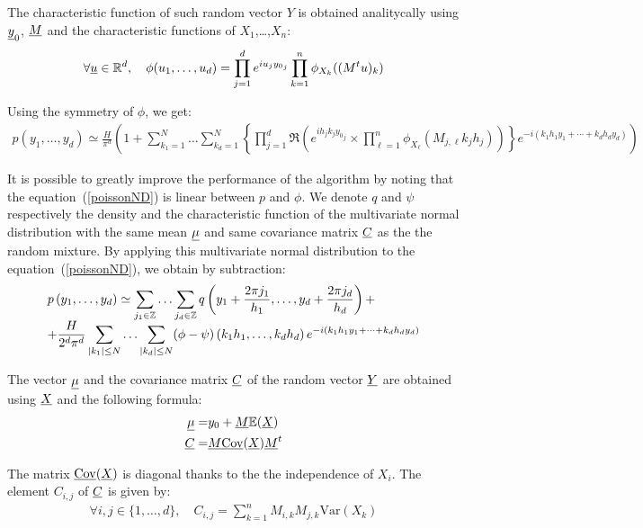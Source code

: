 The characteristic function of such random vector $Y$ is obtained analitycally using ${\underline{y}}_0$, ${\underline{M}}$ and the characteristic functions of $X_1$,\dots,$X_n$:
\begin{align}
  \forall {\underline{u}}\in\mathbb{R}^d,\quad\phi(u_1,\hdots,u_d)=\prod_{j=1}^de^{iu_j{y_0}_j}\prod_{k=1}^n\phi_{X_k}((M^tu)_k)
\end{align}

Using the symmetry of $\phi$, we get:
\begin{align}
  p\left(y_1,\hdots,y_d\right)\simeq\frac{H}{\pi^d} \left(1+
  \sum_{k_1=1}^N\hdots\sum_{k_d=1}^N\left\{\prod_{j=1}^d\mathfrak{R}\left(e^{ih_jk_j{y_0}_j}
  \times\prod_{\ell=1}^n\phi_{X_\ell}(M_{j,\ell}k_jh_j)\right)\right\}e^{-i(k_1h_1y_1+\cdots+k_dh_dy_d)} \right)
\end{align}

It is possible to greatly improve the performance of the algorithm by noting that the equation~(\ref{poissonND}) is linear between $p$
and $\phi $. We denote $q$ and $\psi$ respectively the density and the characteristic function of the multivariate normal distribution with the
same mean ${\underline{\mu}}$ and same covariance matrix ${\underline{C}}$ as the the random mixture. By applying this multivariate normal distribution to the equation~(\ref{poissonND}), we obtain by subtraction:
\begin{align}\label{algoPoisson}
  \begin{array}{p{\textwidth}}
    \multicolumn{1}{l}{\displaystyle p\left(y_1,\hdots,y_d\right)\simeq \sum_{j_1\in\mathbb{Z}}\hdots\sum_{j_d\in\mathbb{Z}}q\left(y_1+\frac{2\pi j_1}{h_1},\hdots,y_d+\frac{2\pi j_d}{h_d}\right)+}\\
    \multicolumn{1}{r}{+\displaystyle \frac{H}{2^d\pi^d}\sum_{|k_1|\leq N}\hdots\sum_{|k_d|\leq N}(\phi-\psi)\left(k_1h_1,\hdots,k_dh_d\right)e^{-i(k_1h_1y_1+\cdots+k_dh_dy_d)}}
  \end{array}
\end{align}

The vector ${\underline{\mu}}$ and the covariance matrix ${\underline{C}}$ of the random vector ${\underline{Y}}$ are obtained using ${\underline{X}}$ and the following formula:
\begin{align}
  {\underline{\mu}}=& y_0 + {\underline{M}}\mathbb{E}({\underline{X}})\\
  {\underline{C}}=&{\underline{M}}{\underline{\mathrm{Cov}}}({\underline{X}}){\underline{M}}^t\\
\end{align}

The matrix ${\underline{\mathrm{Cov}}}({\underline{X}})$ is diagonal thanks to the the independence of $X_i$.
The element $C_{i,j}$ of ${\underline{C}}$ is given by:
\begin{align}
\forall i,j\in\{1,\hdots,d\},\quad C_{i,j}=\sum_{k=1}^nM_{i,k}M_{j,k}\mathrm{Var}(X_k)
\end{align}

